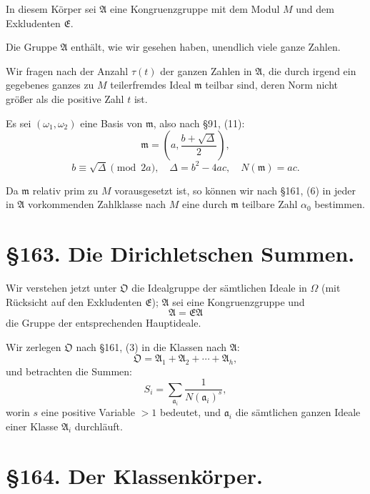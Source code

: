 \documentclass[12pt,a4paper]{article}
\begin{document}
In diesem K\"orper sei $\mathfrak{A}$ eine Kongruenzgruppe mit dem Modul $M$ und dem Exkludenten $\mathfrak{E}$.

Die Gruppe $\mathfrak{A}$ enth\"alt, wie wir gesehen haben, unendlich viele ganze Zahlen.

Wir fragen nach der Anzahl $\tau(t)$ der ganzen Zahlen in $\mathfrak{A}$, die durch irgend ein gegebenes ganzes zu $M$ teilerfremdes Ideal $\mathfrak{m}$ teilbar sind, deren Norm nicht gr\"o\ss{}er als die positive Zahl $t$ ist.

Es sei $(\omega_1, \omega_2)$ eine Basis von $\mathfrak{m}$, also nach \S 91, (11):
\begin{equation}\mathfrak{m} = (a, \frac{b + \sqrt{\Delta}}{2}),\end{equation}
\[b \equiv \sqrt{\Delta} \pmod{2a}, \quad \Delta = b^2 - 4ac, \quad N(\mathfrak{m}) = ac.\]

Da $\mathfrak{m}$ relativ prim zu $M$ vorausgesetzt ist, so k\"onnen wir nach \S 161, (6) in jeder in $\mathfrak{A}$ vorkommenden Zahlklasse nach $M$ eine durch $\mathfrak{m}$ teilbare Zahl $\alpha_0$ bestimmen.

\section*{\S 163. Die Dirichletschen Summen.}

Wir verstehen jetzt unter $\mathfrak{O}$ die Idealgruppe der s\"amtlichen Ideale in $\Omega$ (mit R\"ucksicht auf den Exkludenten $\mathfrak{E}$); $\mathfrak{A}$ sei eine Kongruenzgruppe und
\begin{equation}\mathfrak{A} = \mathfrak{E}\mathfrak{A}\end{equation}
die Gruppe der entsprechenden Hauptideale.

Wir zerlegen $\mathfrak{O}$ nach \S 161, (3) in die Klassen nach $\mathfrak{A}$:
\begin{equation}\mathfrak{O} = \mathfrak{A}_1 + \mathfrak{A}_2 + \cdots + \mathfrak{A}_h,\end{equation}
und betrachten die Summen:
\begin{equation}S_i = \sum_{\mathfrak{a}_i} \frac{1}{N(\mathfrak{a}_i)^s},\end{equation}
worin $s$ eine positive Variable $> 1$ bedeutet, und $\mathfrak{a}_i$ die s\"amtlichen ganzen Ideale einer Klasse $\mathfrak{A}_i$ durchl\"auft.

\section*{\S 164. Der Klassenk\"orper.}
\end{document}

